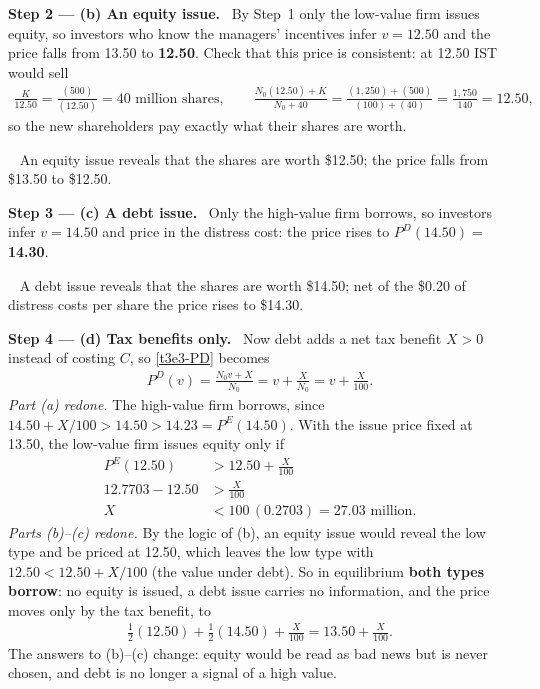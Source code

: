 \documentclass[11pt,a4paper]{article}
\newcommand{\step}[2]{\par\medskip\noindent\textbf{Step #1 --- #2.}~}
\newcommand{\answer}[1]{\par\smallskip\noindent\fbox{\textbf{Answer #1.}}~}
\begin{document}
\step{2}{(b) An equity issue} By Step~1 only the low-value firm issues equity, so investors who know the managers' incentives infer $v=12.50$ and the price falls from 13.50 to \textbf{12.50}. Check that this price is consistent: at 12.50 IST would sell
\begin{align}
  \frac{K}{12.50} = \frac{(500)}{(12.50)} = 40 \text{ million shares}, \qquad
  \frac{N_0(12.50)+K}{N_0+40} = \frac{(1{,}250)+(500)}{(100)+(40)} = \frac{1{,}750}{140} = 12.50, \nonumber
\end{align}
so the new shareholders pay exactly what their shares are worth.

\answer{(b)} An equity issue reveals that the shares are worth \$12.50; the price falls from \$13.50 to \$12.50.

\step{3}{(c) A debt issue} Only the high-value firm borrows, so investors infer $v=14.50$ and price in the distress cost: the price rises to $P^D(14.50)=$ \textbf{14.30}.

\answer{(c)} A debt issue reveals that the shares are worth \$14.50; net of the \$0.20 of distress costs per share the price rises to \$14.30.

\step{4}{(d) Tax benefits only} Now debt adds a net tax benefit $X>0$ instead of costing $C$, so \eqref{t3e3-PD} becomes
\begin{align}
  P^D(v) = \frac{N_0v+X}{N_0} = v+\frac{X}{N_0} = v+\frac{X}{100}. \nonumber
\end{align}
\textit{Part (a) redone.} The high-value firm borrows, since $14.50+X/100>14.50>14.23=P^E(14.50)$. With the issue price fixed at 13.50, the low-value firm issues equity only if
\begin{align}
  P^E(12.50) &> 12.50 + \frac{X}{100} \nonumber\\
  12.7703 - 12.50 &> \frac{X}{100} \nonumber\\
  X &< 100\,(0.2703) = 27.03 \text{ million}. \label{t3e3-X}
\end{align}
\textit{Parts (b)--(c) redone.} By the logic of (b), an equity issue would reveal the low type and be priced at 12.50, which leaves the low type with $12.50<12.50+X/100$ (the value under debt). So in equilibrium \textbf{both types borrow}: no equity is issued, a debt issue carries no information, and the price moves only by the tax benefit, to
\begin{align}
  \tfrac12(12.50)+\tfrac12(14.50)+\frac{X}{100} = 13.50+\frac{X}{100}. \nonumber
\end{align}
The answers to (b)--(c) change: equity would be read as bad news but is never chosen, and debt is no longer a signal of a high value.
\end{document}
